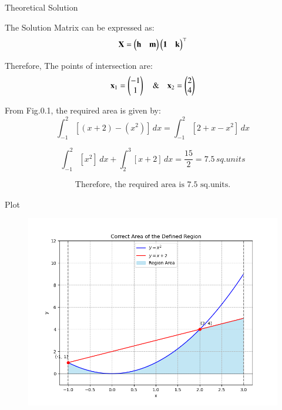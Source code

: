 \documentclass{beamer}
\begin{document}
\begin{frame}{Theoretical Solution}

The Solution Matrix can be expressed as: 
\begin{equation}
    \mathbf{X} = \begin{pmatrix}\mathbf{h} & \mathbf{m}\end{pmatrix}\begin{pmatrix}\mathbf{1} & \mathbf{k}\end{pmatrix}^\top
\end{equation}

Therefore, The points of intersection are:
\begin{equation}
    \mathbf{x}_1 = \begin{pmatrix}-1 \\ 1\end{pmatrix} \quad \& \quad \mathbf{x}_2 = \begin{pmatrix}2 \\4\end{pmatrix}
\end{equation}


From Fig.0.1, the required area is given by:
\begin{equation}
    \int_{-1}^{2} [(x+2) - (x^2)] \,dx = \int_{-1}^{2} [2 + x -x^2] \,dx
\end{equation}

\begin{equation}
 \int_{-1}^{2} [x^2] \,dx + \int_{2}^{3} [x+2] \,dx  = \dfrac{15}{2} = 7.5 \, sq.units   
\end{equation}

\begin{align*}
\boxed{\text{Therefore, the required area is 7.5 sq.units.}}
\end{align*}



\end{frame}




\begin{frame}{Plot}
\begin{figure}
    \centering
    \includegraphics[width=0.8\linewidth]{Beamer/figs/plot.png}
    \caption{}
    \label{fig:placeholder}
\end{figure}

\end{frame}
\end{document}

